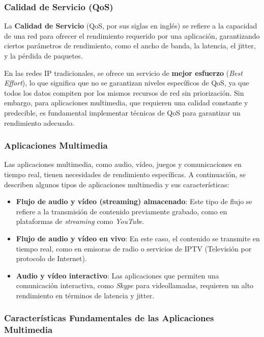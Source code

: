\documentclass[a4paper,12pt]{article}
\begin{document}
\subsubsection{Calidad de Servicio (QoS)}

La \textbf{Calidad de Servicio} (QoS, por sus siglas en inglés) se refiere a la capacidad de una red para ofrecer el rendimiento requerido por una aplicación, garantizando ciertos parámetros de rendimiento, como el ancho de banda, la latencia, el jitter, y la pérdida de paquetes. 

En las redes IP tradicionales, se ofrece un servicio de \textbf{mejor esfuerzo} (\textit{Best Effort}), lo que significa que no se garantizan niveles específicos de QoS, ya que todos los datos compiten por los mismos recursos de red sin priorización. Sin embargo, para aplicaciones multimedia, que requieren una calidad constante y predecible, es fundamental implementar técnicas de QoS para garantizar un rendimiento adecuado.

\subsubsection{Aplicaciones Multimedia}

Las aplicaciones multimedia, como audio, vídeo, juegos y comunicaciones en tiempo real, tienen necesidades de rendimiento específicas. A continuación, se describen algunos tipos de aplicaciones multimedia y sus características:

\begin{itemize}
    \item \textbf{Flujo de audio y vídeo (streaming) almacenado}: Este tipo de flujo se refiere a la transmisión de contenido previamente grabado, como en plataformas de \textit{streaming} como \textit{YouTube}.
    \item \textbf{Flujo de audio y vídeo en vivo}: En este caso, el contenido se transmite en tiempo real, como en emisoras de radio o servicios de IPTV (Televisión por protocolo de Internet).
    \item \textbf{Audio y vídeo interactivo}: Las aplicaciones que permiten una comunicación interactiva, como \textit{Skype} para videollamadas, requieren un alto rendimiento en términos de latencia y jitter.
\end{itemize}

\subsubsection{Características Fundamentales de las Aplicaciones Multimedia}
\end{document}
